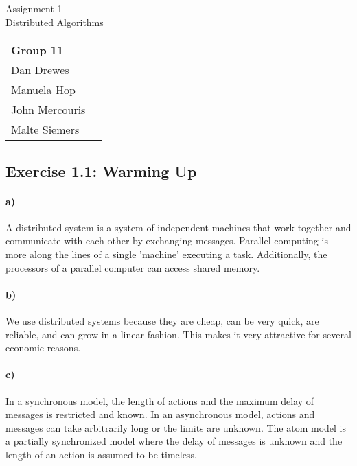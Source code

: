 \documentclass[12pt,a4paper]{article}
\begin{document}
\begin{center}
  \Large Assignment 1\\
  \large Distributed Algorithms
\end{center}
\begin{flushright}
  \begin{tabular}{ll}
    \textbf{Group 11} \\
    Dan Drewes     	  \\ 
    Manuela Hop       \\ 
    John Mercouris    \\
    Malte Siemers     \\
  \end{tabular} 
\end{flushright}

\subsection*{Exercise 1.1: Warming Up}
\paragraph*{a)} %
A distributed system is a system of independent machines that work together and communicate with each other by exchanging messages. Parallel computing is more along the lines of a single 'machine' executing a task. Additionally, the processors of a parallel computer can access shared memory.
\paragraph{b)} %
We use distributed systems because they are cheap, can be very quick, are reliable, and can grow in a linear fashion. This makes it very attractive for several economic reasons. 
\paragraph{c)} %
In a synchronous model, the length of actions and the maximum delay of messages is restricted and known. In an asynchronous model, actions and messages can take arbitrarily long or the limits are unknown. The atom model is a partially synchronized model where the delay of messages is unknown and the length of an action is assumed to be timeless.
\end{document}
